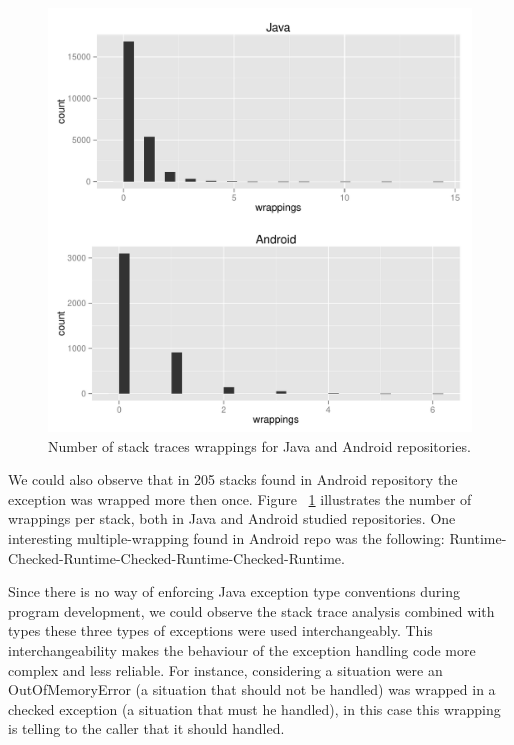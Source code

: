 \documentclass[conference]{IEEEtran}
\begin{document}

\begin{figure}
  \begin{center}
    \includegraphics[scale=0.4]{stack-wrappings-hist.pdf}
  \end{center}
  \caption{Number of stack traces wrappings for Java and Android repositories. }
  \label{fig:sizewrapbhists}
\end{figure}

We could also observe that in 205 stacks found in Android repository the exception was wrapped 
more then once. Figure ~\ref{fig:sizewrapbhists}  illustrates the number of wrappings per stack, both
 in Java and Android studied repositories. One interesting multiple-wrapping found in Android repo was the 
following: Runtime-Checked-Runtime-Checked-Runtime-Checked-Runtime.

Since there is no way of enforcing Java exception type conventions during program development,
we could observe the stack trace analysis combined with types these three types
of exceptions were used interchangeably. This interchangeability makes the
behaviour of the exception handling code more complex and less reliable. For
instance, considering a situation were an OutOfMemoryError (a situation that
should not be handled) was wrapped in a checked exception (a situation that must
he handled), in this case this wrapping is telling to the caller that it should
handled.
\end{document}
